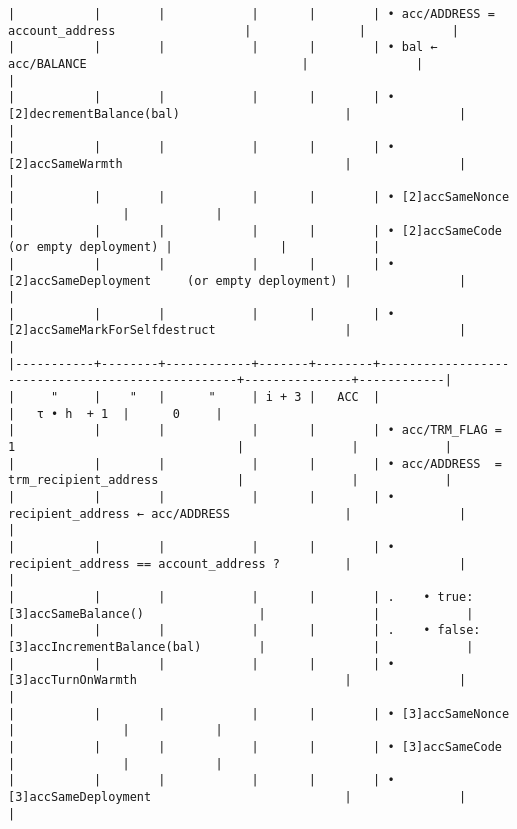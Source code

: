 \documentclass[varwidth=\maxdimen,margin=0.5cm,multi={verbatim}]{standalone}
\begin{document}
\begin{verbatim}
|           |        |            |       |        | • acc/ADDRESS = account_address                  |               |            |
|           |        |            |       |        | • bal ← acc/BALANCE                              |               |            |
|           |        |            |       |        | • [2]decrementBalance(bal)                       |               |            |
|           |        |            |       |        | • [2]accSameWarmth                               |               |            |
|           |        |            |       |        | • [2]accSameNonce                                |               |            |
|           |        |            |       |        | • [2]accSameCode           (or empty deployment) |               |            |
|           |        |            |       |        | • [2]accSameDeployment     (or empty deployment) |               |            |
|           |        |            |       |        | • [2]accSameMarkForSelfdestruct                  |               |            |
|-----------+--------+------------+-------+--------+--------------------------------------------------+---------------+------------|
|     "     |    "   |      "     | i + 3 |   ACC  |                                                  |   τ • h  + 1  |      0     |
|           |        |            |       |        | • acc/TRM_FLAG = 1                               |               |            |
|           |        |            |       |        | • acc/ADDRESS  = trm_recipient_address           |               |            |
|           |        |            |       |        | • recipient_address ← acc/ADDRESS                |               |            |
|           |        |            |       |        | • recipient_address == account_address ?         |               |            |
|           |        |            |       |        | .    • true:  [3]accSameBalance()                |               |            |
|           |        |            |       |        | .    • false: [3]accIncrementBalance(bal)        |               |            |
|           |        |            |       |        | • [3]accTurnOnWarmth                             |               |            |
|           |        |            |       |        | • [3]accSameNonce                                |               |            |
|           |        |            |       |        | • [3]accSameCode                                 |               |            |
|           |        |            |       |        | • [3]accSameDeployment                           |               |            |

\end{verbatim}
\end{document}
